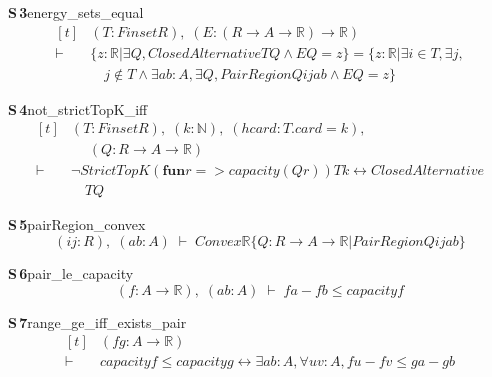 \documentclass[conference]{IEEEtran}
\theoremstyle{definition}
\newcommand{\lean}[1]{\textsf{\footnotesize #1}}
\begin{document}
\noindent\textbf{S\,3}\quad\lean{energy\_sets\_equal}
{\footnotesize\[ \begin{aligned}[t]
&(\mathit{T} : \mathit{Finset} \mathit{R}),\; (\mathit{E} : (\mathit{R} \to \mathit{A} \to \mathbb{R} ) \to \mathbb{R} )\\
\vdash\;&\{ \mathit{z} : \mathbb{R} | \exists \mathit{Q}, \mathit{ClosedAlternative} \mathit{T} \mathit{Q} \wedge \mathit{E} \mathit{Q} = \mathit{z}\} = \{ \mathit{z} : \mathbb{R} | \exists \mathit{i} \in \mathit{T}, \exists \mathit{j},\\
&\quad \mathit{j} \notin \mathit{T} \wedge \exists \mathit{a} \mathit{b} : \mathit{A}, \exists \mathit{Q}, \mathit{PairRegion} \mathit{Q} \mathit{i} \mathit{j} \mathit{a} \mathit{b} \wedge \mathit{E} \mathit{Q} = \mathit{z}\}
\end{aligned} \]}

\noindent\textbf{S\,4}\quad\lean{not\_strictTopK\_iff}
{\footnotesize\[ \begin{aligned}[t]
&(\mathit{T} : \mathit{Finset} \mathit{R}),\; (\mathit{k} : \mathbb{N} ),\; (\mathit{hcard} : \mathit{T}.\mathit{card} = \mathit{k}),\\
&\quad \; (\mathit{Q} : \mathit{R} \to \mathit{A} \to \mathbb{R} )\\
\vdash\;&\neg \mathit{StrictTopK} (\mathbf{fun} \mathit{r} => \mathit{capacity} (\mathit{Q} \mathit{r})) \mathit{T} \mathit{k} \leftrightarrow \mathit{ClosedAlternative}\\
&\quad \mathit{T} \mathit{Q}
\end{aligned} \]}

\noindent\textbf{S\,5}\quad\lean{pairRegion\_convex}
{\footnotesize\[ (\mathit{i} \mathit{j} : \mathit{R}),\; (\mathit{a} \mathit{b} : \mathit{A}) \;\vdash\; \mathit{Convex} \mathbb{R} \{ \mathit{Q} : \mathit{R} \to \mathit{A} \to \mathbb{R} | \mathit{PairRegion} \mathit{Q} \mathit{i} \mathit{j} \mathit{a} \mathit{b}\} \]}

\noindent\textbf{S\,6}\quad\lean{pair\_le\_capacity}
{\footnotesize\[ (\mathit{f} : \mathit{A} \to \mathbb{R} ),\; (\mathit{a} \mathit{b} : \mathit{A}) \;\vdash\; \mathit{f} \mathit{a} - \mathit{f} \mathit{b} \leq \mathit{capacity} \mathit{f} \]}

\noindent\textbf{S\,7}\quad\lean{range\_ge\_iff\_exists\_pair}
{\footnotesize\[ \begin{aligned}[t]
&(\mathit{f} \mathit{g} : \mathit{A} \to \mathbb{R} )\\
\vdash\;&\mathit{capacity} \mathit{f} \leq \mathit{capacity} \mathit{g} \leftrightarrow \exists \mathit{a} \mathit{b} : \mathit{A}, \forall \mathit{u} \mathit{v} : \mathit{A}, \mathit{f} \mathit{u} - \mathit{f} \mathit{v} \leq \mathit{g} \mathit{a} - \mathit{g} \mathit{b}
\end{aligned} \]}
\end{document}
